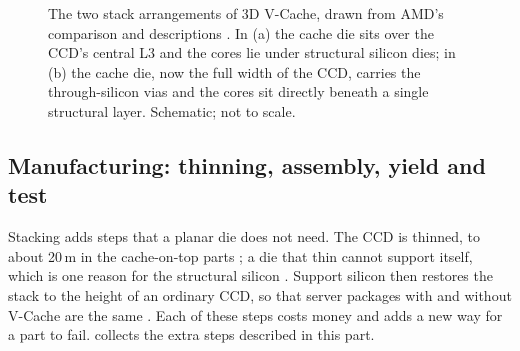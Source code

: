 \begin{figure}[htbp]
\caption[The two stack arrangements of 3D V-Cache]{The two stack arrangements of 3D V-Cache, drawn from AMD's comparison \cite[slide~7]{lambertHeterogenousIntegrationHigh2025} and descriptions \cite{wuu2022vcache,alam2ndGeneration3D2024,cozmaAMDs9800X3D2nd2024}. In (a) the cache die sits over the CCD's central L3 and the cores lie under structural silicon dies; in (b) the cache die, now the full width of the CCD, carries the through-silicon vias and the cores sit directly beneath a single structural layer. Schematic; not to scale.}
\label{fig:vcache-generations}
\end{figure}


\subsection{Manufacturing: thinning, assembly, yield and test}
\label{sec:manufacturing}
Stacking adds steps that a planar die does not need. The CCD is thinned, to about 20\,\textmu m in the cache-on-top parts \cite{cozmaAMDs9800X3D2nd2024}; a die that thin cannot support itself, which is one reason for the structural silicon \cite[slide~12]{wuu2022vcache}. Support silicon then restores the stack to the height of an ordinary CCD, so that server packages with and without V-Cache are the same \cite[slide~17]{wuu2022vcache}. Each of these steps costs money and adds a new way for a part to fail.  collects the extra steps described in this part.

